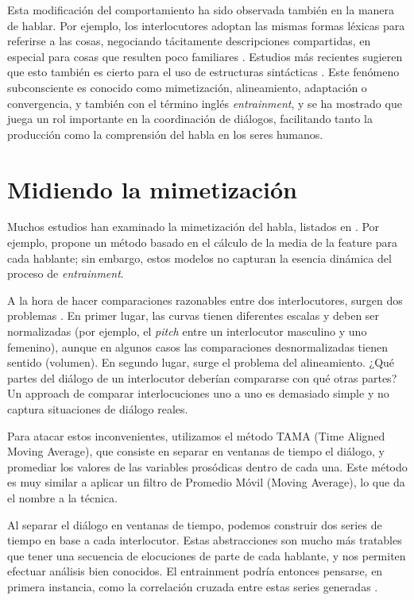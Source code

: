 Esta modificación del comportamiento ha sido observada también en la manera de hablar. Por ejemplo, los interlocutores adoptan las mismas formas léxicas para referirse a las cosas, negociando tácitamente descripciones compartidas, en especial para cosas que resulten poco familiares \cite{BRE1996}. Estudios más recientes sugieren que esto también es cierto para el uso de estructuras sintácticas \cite{REI2006}. Este fenómeno subconsciente es conocido como mimetización, alineamiento, adaptación o convergencia, y también con el término inglés \emph{entrainment}, y se ha mostrado que juega un rol importante en la coordinación de diálogos, facilitando tanto la producción como la comprensión del habla en los seres humanos.

\section{Midiendo la mimetización}

Muchos estudios han examinado la mimetización del habla, listados en \cite{DEL2013}. Por ejemplo, \cite{LEV2012} propone un método basado en el cálculo de la media de la feature para cada hablante; sin embargo, estos modelos no capturan la esencia dinámica del proceso de \emph{entrainment}.

A la hora de hacer comparaciones razonables entre dos interlocutores, surgen dos problemas \cite{KOU2008}. En primer lugar, las curvas tienen diferentes escalas y deben ser normalizadas (por ejemplo, el \emph{pitch} entre un interlocutor masculino y uno femenino), aunque en algunos casos
las comparaciones desnormalizadas tienen sentido (volumen). En segundo lugar, surge el problema del alineamiento. ¿Qué partes del diálogo de un interlocutor deberían compararse con qué otras partes? Un approach de comparar interlocuciones uno a uno es demasiado simple y no captura situaciones de diálogo reales.

Para atacar estos inconvenientes, utilizamos el método TAMA (Time Aligned Moving Average), que consiste en separar en ventanas de tiempo el diálogo, y promediar los valores de las variables prosódicas dentro de cada una. Este método es muy similar a aplicar un filtro de Promedio Móvil (Moving Average), lo que da el nombre a la técnica.

Al separar el diálogo en ventanas de tiempo, podemos construir dos series de tiempo en base a cada interlocutor. Estas abstracciones son mucho más tratables que tener una secuencia de elocuciones de parte de cada hablante, y nos permiten efectuar análisis bien conocidos. El entrainment podría entonces pensarse, en primera instancia, como la correlación cruzada entre estas series generadas \cite{CHATFIELD}.
